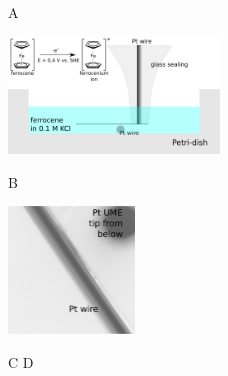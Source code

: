 \documentclass[a4paper, 11pt, oneside, bibliography=totoc]{article}
\begin{document}
\begin{figure}
\centering
\begin{flushleft}\hspace{3cm}A\end{flushleft}

\includegraphics[width=0.5\textwidth]{wire.eps}
\vspace{0.5cm}
\begin{flushleft}\hspace{3cm}B\end{flushleft}

\includegraphics[width=0.3\textwidth]{wire_photo.eps}
\vspace{0.5cm}

\hspace{0cm} C \hspace{5cm} D \hfill


\end{figure}
\end{document}
